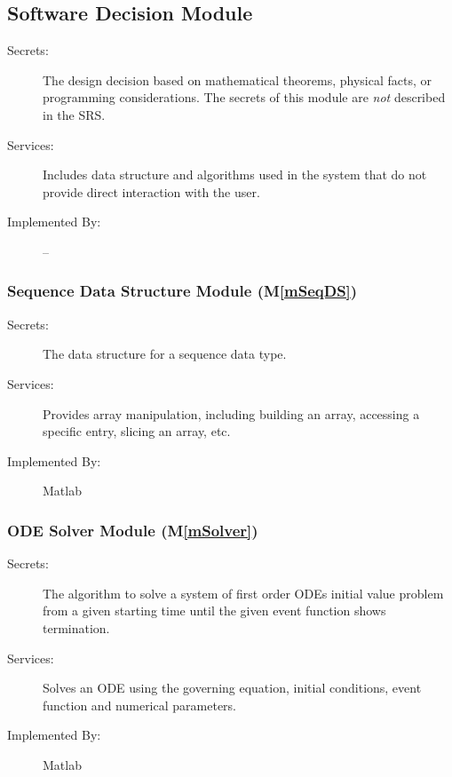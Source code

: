 \documentclass[12pt]{article}
\newcommand{\mref}[1]{M\ref{#1}}
\begin{document}
\subsection{Software Decision Module}

\begin{description}
\item[Secrets:] The design decision based on mathematical theorems, physical
  facts, or programming considerations. The secrets of this module are
  \emph{not} described in the SRS.
\item[Services:] Includes data structure and algorithms used in the system that
  do not provide direct interaction with the user. 
\item[Implemented By:] --
\end{description}

\subsubsection{Sequence Data Structure Module (\mref{mSeqDS})}

\begin{description}
\item[Secrets:] The data structure for a sequence data type.
\item[Services:] Provides array manipulation, including building an array,
  accessing a specific entry, slicing an array, etc.
\item[Implemented By:] Matlab
\end{description}

\subsubsection{ODE Solver Module (\mref{mSolver})}

\begin{description}
\item[Secrets:] The algorithm to solve a system of first order ODEs initial
  value problem from a given starting time until the given event function shows
  termination.
\item[Services:] Solves an ODE using the governing equation, initial
  conditions, event function and numerical parameters.
\item[Implemented By:] Matlab
\end{description}
\end{document}
